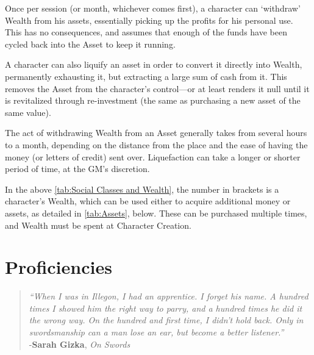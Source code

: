 \documentclass[oneside,11pt,english]{book}
\begin{document}
Once per session (or month, whichever comes first), a character can ‘withdraw’ Wealth from his assets, 
essentially picking up the profits for his personal use. This has no consequences, and assumes that enough 
of the funds have been cycled back into the Asset to keep it running. 

A character can also liquify an asset in order to convert it directly into Wealth, permanently exhausting it, 
but extracting a large sum of cash from it. This removes the Asset from the character’s control—or at 
least renders it null until it is revitalized through re-investment (the same as purchasing a new asset of the 
same value).

The act of withdrawing Wealth from an Asset generally takes from several hours to a month, depending 
on the distance from the place and the ease of having the money (or letters of credit) sent over. 
Liquefaction can take a longer or shorter period of time, at the GM’s discretion. 

In the above \autoref{tab:Social Classes and Wealth}, the number in brackets is a character’s Wealth, which can be used either to acquire additional money or assets, as detailed in \autoref{tab:Assets}, below. These can be purchased multiple times, and Wealth must be spent at Character Creation.


\chapter{Proficiencies}\label{ch:proficiencies} 
\startcontents[chapters]
\clearpage
\begin{quote}
	\centering
	\emph{“When I was in Illegon, I had an apprentice. I forget his name. A hundred times I showed him the right way to parry, and a hundred times he did it the wrong way. On the hundred and first time, I didn’t hold back. Only in swordsmanship can a man lose an ear, but become a better listener.”}\\
	\hfill -\textbf{Sarah Gizka}, \textit{On Swords}
\end{quote}
\end{document}
